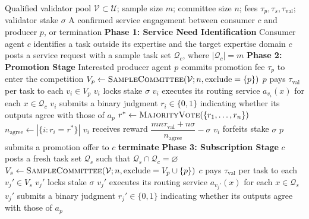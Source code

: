 \begin{algorithm}[!htbp]
\caption{Agent Service Routing Protocol}
\label{alg:ecosystem}
\begin{algorithmic}[1]
\Require Qualified validator pool $\mathcal{V} \subset \mathcal{U}$; sample size $m$; committee size $n$; fees $\tau_p, \tau_s, \tau_{\text{val}}$; validator stake $\sigma$
\Ensure A confirmed service engagement between consumer $c$ and producer $p$, or termination
\Statex
\Statex \textbf{Phase 1: Service Need Identification}
\State Consumer agent $c$ identifies a task outside its expertise and the target expertise domain
\State $c$ posts a service request with a sample task set $\mathcal{Q}_c$, where $|\mathcal{Q}_c| = m$
\Statex
\Statex \textbf{Phase 2: Promotion Stage}
\State Interested producer agent $p$ commits promotion fee $\tau_p$ to enter the competition
\State $V_p \gets \textsc{SampleCommittee}(\mathcal{V}; n, \text{exclude}=\{p\})$ 
\State $p$ pays $\tau_{\text{val}}$ per task to each $v_i \in V_p$
    \State $v_i$ locks stake $\sigma$
    \State $v_i$ executes its routing service $a_{v_i}(x)$ for each $x \in \mathcal{Q}_c$
    \State $v_i$ submits a binary judgment $r_i \in \{0,1\}$ indicating whether its outputs agree with those of $a_p$
\EndFor
\State $r^* \gets \textsc{MajorityVote}(\{r_1, \dots, r_n\})$
\State $n_{\text{agree}} \gets |\{i : r_i = r^*\}|$
 
        \State $v_i$ receives reward $\dfrac{mn\tau_{\text{val}} + n\sigma}{n_{\text{agree}}} - \sigma$
    \Else
        \State $v_i$ forfeits stake $\sigma$
    \EndIf
\EndFor
{} 
    \State $p$ submits a promotion offer to $c$
\Else
    \State \textbf{terminate}
\EndIf
\Statex
\Statex \textbf{Phase 3: Subscription Stage}
\State $c$ posts a fresh task set $\mathcal{Q}_s$ such that $\mathcal{Q}_s \cap \mathcal{Q}_c = \varnothing$
\State $V_s \gets \textsc{SampleCommittee}(\mathcal{V}; n, \text{exclude}=V_p \cup \{p\})$ 
\State $c$ pays $\tau_{\text{val}}$ per task to each $v_j' \in V_s$
    \State $v_j'$ locks stake $\sigma$
    \State $v_j'$ executes its routing service $a_{v_j'}(x)$ for each $x \in \mathcal{Q}_s$
    \State $v_j'$ submits a binary judgment $r_j' \in \{0,1\}$ indicating whether its outputs agree with those of $a_p$

\end{algorithmic}
\end{algorithm}
